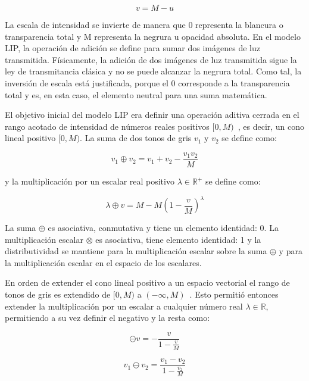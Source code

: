 \begin{equation}
	v = M - u
\end{equation}

La escala de intensidad se invierte de manera que 0 representa la blancura o transparencia total y M representa la negrura u opacidad absoluta. En el modelo LIP, la operación de adición se define para sumar dos imágenes de luz transmitida. Físicamente, la adición de dos imágenes de luz transmitida sigue la ley de transmitancia clásica y no se puede alcanzar la negrura total. Como tal, la inversión de escala está justificada, porque el 0 corresponde a la transparencia total y es, en esta caso, el elemento neutral para una suma matemática.

El objetivo inicial del modelo LIP era definir una operación aditiva cerrada en el rango acotado de intensidad de números reales positivos $[0, M)$~\cite{jourlin1988model}, es decir, un cono lineal positivo $[0, M )$. La suma de dos tonos de gris $v_1$ y $v_2$ se define como:

\begin{equation}
	v_1\oplus v_2=v_1+v_2-\frac{v_1v_2}{M}
\end{equation}

y la multiplicación por un escalar real positivo $\lambda \in \mathbb{R}^+$ se define como:

\begin{equation}
	\lambda \oplus v = M - M\left(1-\frac{v}{M}\right)^\lambda
\end{equation}

La suma $\oplus$ es asociativa, conmutativa y tiene un elemento identidad: 0. La multiplicaci\'on escalar $\otimes$ es asociativa, tiene elemento identidad: 1 y la distributividad se mantiene para la multiplicación escalar sobre la suma $\oplus$ y para la multiplicación escalar en el espacio de los escalares.

En orden de extender el cono lineal positivo a un espacio vectorial el rango de tonos de gris es extendido de $[0,M)$ a $(-\infty,M)$~\cite{jourlin2016logarithmic}. Esto permiti\'o entonces extender la multiplicaci\'on por un escalar a cualquier n\'umero real $\lambda \in \mathbb{R}$, permitiendo a su vez definir el negativo y la resta como:

\begin{equation}
	\ominus v=-\frac{v}{1-\frac{v}{M}}
\end{equation}

\begin{equation}
	v_1 \ominus v_2 = \frac{v_1-v_2}{1-\frac{v_2}{M}}
\end{equation}

